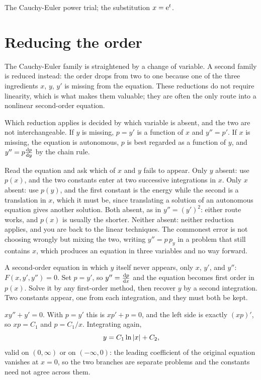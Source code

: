 \begin{seealsob}The Cauchy-Euler power trial; the substitution $x=\mathrm{e}^{t}$.\end{seealsob}

\section{Reducing the order}

The Cauchy-Euler family is straightened by a change of variable. A second family is reduced instead: the order drops from two to one because one of the three ingredients $x$, $y$, $y'$ is missing from the equation. These reductions do not require linearity, which is what makes them valuable; they are often the only route into a nonlinear second-order equation.

Which reduction applies is decided by which variable is absent, and the two are not interchangeable. If $y$ is missing, $p=y'$ is a function of $x$ and $y''=p'$. If $x$ is missing, the equation is autonomous, $p$ is best regarded as a function of $y$, and $y''=p\frac{\mathrm{d}p}{\mathrm{d}y}$ by the chain rule.

\begin{keynote}
Read the equation and ask which of $x$ and $y$ fails to appear. Only $y$ absent: use $p(x)$, and the two constants enter at two successive integrations in $x$. Only $x$ absent: use $p(y)$, and the first constant is the energy while the second is a translation in $x$, which it must be, since translating a solution of an autonomous equation gives another solution. Both absent, as in $y''=(y')^{2}$: either route works, and $p(x)$ is usually the shorter. Neither absent: neither reduction applies, and you are back to the linear techniques. The commonest error is not choosing wrongly but mixing the two, writing $y''=p\,p_y$ in a problem that still contains $x$, which produces an equation in three variables and no way forward.
\end{keynote}

\cue A second-order equation in which $y$ itself never appears, only $x$, $y'$, and $y''$: $F(x,y',y'')=0$.
\method Set $p=y'$, so $y''=\frac{\mathrm{d}p}{\mathrm{d}x}$ and the equation becomes first order in $p(x)$. Solve it by any first-order method, then recover $y$ by a second integration. Two constants appear, one from each integration, and they must both be kept.

\begin{worked}
$xy''+y'=0$. With $p=y'$ this is $xp'+p=0$, and the left side is exactly $(xp)'$, so $xp=C_1$ and $p=C_1/x$. Integrating again,
\[y=C_1\ln\left\lvert x\right\rvert+C_2,\]
valid on $(0,\infty)$ or on $(-\infty,0)$: the leading coefficient of the original equation vanishes at $x=0$, so the two branches are separate problems and the constants need not agree across them.
\end{worked}

